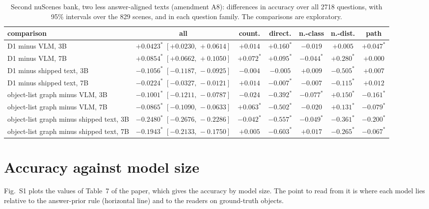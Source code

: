 \documentclass[10pt]{article}
\renewcommand{\thetable}{S\arabic{table}}
\newcommand{\fixtab}[1]{\renewcommand{\thetable}{#1}}
\begin{document}
\fixtab{S14b}\begin{table}[h]\centering\footnotesize
\caption{Second nuScenes bank, two less answer-aligned texts (amendment A8): differences in accuracy over all 2718 questions, with 95\% intervals over the 829 scenes, and in each question family. The comparisons are exploratory.}\label{tab:s14b}
\setlength{\tabcolsep}{3.5pt}\begin{tabular}{@{}lcccccc@{}}
\toprule
comparison & all & count. & direct. & n.-class & n.-dist. & path \\ \midrule
D1 minus VLM, 3B & $+0.0423^{*}$ $[+0.0230,\,+0.0614]$ & $+0.014$ & $+0.160^{*}$ & $-0.019$ & $+0.005$ & $+0.047^{*}$ \\
D1 minus VLM, 7B & $+0.0854^{*}$ $[+0.0662,\,+0.1050]$ & $+0.072^{*}$ & $+0.095^{*}$ & $-0.044^{*}$ & $+0.280^{*}$ & $+0.000$ \\
D1 minus shipped text, 3B & $-0.1056^{*}$ $[-0.1187,\,-0.0925]$ & $-0.004$ & $-0.005$ & $+0.009$ & $-0.505^{*}$ & $+0.007$ \\
D1 minus shipped text, 7B & $-0.0224^{*}$ $[-0.0327,\,-0.0121]$ & $+0.014$ & $-0.007^{*}$ & $-0.007$ & $-0.115^{*}$ & $+0.012$ \\
object-list graph minus VLM, 3B & $-0.1001^{*}$ $[-0.1211,\,-0.0787]$ & $-0.024$ & $-0.392^{*}$ & $-0.077^{*}$ & $+0.150^{*}$ & $-0.161^{*}$ \\
object-list graph minus VLM, 7B & $-0.0865^{*}$ $[-0.1090,\,-0.0633]$ & $+0.063^{*}$ & $-0.502^{*}$ & $-0.020$ & $+0.131^{*}$ & $-0.079^{*}$ \\
object-list graph minus shipped text, 3B & $-0.2480^{*}$ $[-0.2676,\,-0.2286]$ & $-0.042^{*}$ & $-0.557^{*}$ & $-0.049^{*}$ & $-0.361^{*}$ & $-0.200^{*}$ \\
object-list graph minus shipped text, 7B & $-0.1943^{*}$ $[-0.2133,\,-0.1750]$ & $+0.005$ & $-0.603^{*}$ & $+0.017$ & $-0.265^{*}$ & $-0.067^{*}$ \\
\bottomrule
\end{tabular}
\end{table}

\section{Accuracy against model size}
Fig.~S1 plots the values of Table~7 of the paper, which gives the accuracy by model size. The point to read from it is where each model lies relative to the answer-prior rule (horizontal line) and to the readers on ground-truth objects.
\end{document}
